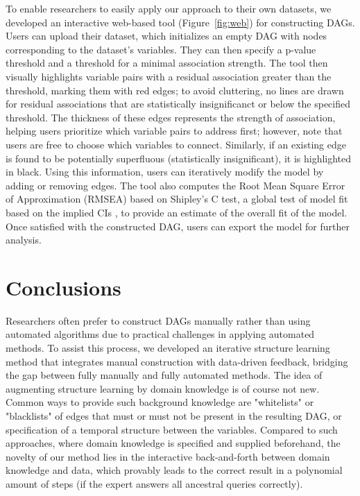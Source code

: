 \documentclass{uai2025} %
\begin{document}
To enable researchers to easily apply our approach to their own datasets, we
developed an interactive web-based tool (Figure~\ref{fig:web}) for constructing
DAGs. Users can upload their dataset, which initializes an empty DAG with nodes
corresponding to the dataset's variables. They can then specify a p-value
threshold and a threshold for a minimal association strength. The tool 
then visually highlights variable pairs
with a residual association greater than the threshold, marking them with red
edges; to avoid cluttering, no lines are drawn for residual associations that
are statistically insignificanct or below the specified threshold.
The thickness of these edges represents the strength of association,
helping users prioritize which variable pairs to address first; however, note that
users are free to choose which variables to connect. Similarly, if
an existing edge is found to be potentially superfluous (statistically insignificant),
it is highlighted in black. Using this information, users can iteratively
modify the model by adding or removing edges. The tool also computes the Root
Mean Square Error of Approximation (RMSEA) based on Shipley's C test, a global test 
of model fit based on the implied CIs \citep{Shipley2000}, to provide an estimate of the
overall fit of the model. Once satisfied with the constructed DAG, users can
export the model for further analysis.

\section{Conclusions}

Researchers often prefer to construct DAGs manually rather than using automated
algorithms due to practical challenges in applying automated methods. To assist
this process, we developed an iterative structure learning method that
integrates manual construction with data-driven feedback, bridging
the gap between fully manually and fully automated methods.
The idea of augmenting structure learning by domain knowledge is of course not 
new. Common ways to provide such background knowledge are "whitelists" or "blacklists"
of edges that must or must not be present in the resulting DAG, or specification
of a temporal structure between the variables. 
Compared to such approaches, where domain knowledge 
is specified and supplied beforehand, the novelty of our method lies in the interactive
back-and-forth between domain knowledge and data, which provably leads to the correct
result in a polynomial amount of steps (if the expert answers all
ancestral queries correctly).
\end{document}
